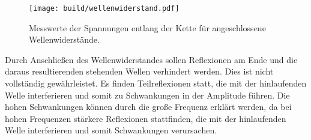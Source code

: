 \begin{figure}
  \centering
  \texttt{[image: build/wellenwiderstand.pdf]}
\caption{Messwerte der Spannungen entlang der Kette für angeschlossene Wellenwiderstände.}
  \label{fig:wellenwiderstand}
\end{figure}

Durch Anschließen des Wellenwiderstandes sollen Reflexionen am Ende und die daraus resultierenden stehenden Wellen verhindert werden. Dies ist nicht vollständig gewährleistet. Es finden Teilreflexionen statt, die mit der hinlaufenden Welle interferieren und somit zu Schwankungen in der Amplitude führen. Die hohen Schwankungen können durch die große Frequenz erklärt werden, da bei hohen Frequenzen stärkere Reflexionen stattfinden, die mit der hinlaufenden Welle interferieren und somit Schwankungen verursachen.
